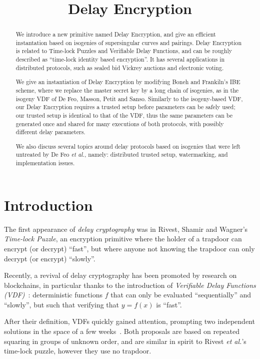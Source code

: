\documentclass{llncs}
\title{Delay Encryption}
\begin{document}
\maketitle

\begin{abstract}
  We introduce a new primitive named Delay Encryption, and give an
  efficient instantation based on isogenies of supersingular curves
  and pairings. %
  Delay Encryption is related to Time-lock Puzzles and Verifiable
  Delay Functions, and can be roughly described as ``time-lock
  identity based encryption''. %
  It has several applications in distributed protocols, such as
  sealed bid Vickrey auctions and electronic voting.

  We give an instantiation of Delay Encryption by modifying Boneh and
  Frankiln's IBE scheme, where we replace the master secret key by a
  long chain of isogenies, as in the isogeny VDF of De Feo, Masson, 
  Petit and Sanso. %
  Similarly to the isogeny-based VDF, our Delay Encryption requires a
  trusted setup before parameters can be safely used; our trusted
  setup is identical to that of the VDF, thus the same parameters can
  be generated once and shared for many executions of both protocols,
  with possibly different delay parameters.

  We also discuss several topics around delay protocols
  based on isogenies that were left untreated by De Feo \emph{et al.},
  namely: distributed trusted setup, watermarking, and implementation
  issues.
\end{abstract}

\section{Introduction}
\label{sec:introduction}

The first appearance of \emph{delay cryptography} was in Rivest,
Shamir and Wagner's~\cite{TLP} \emph{Time-lock Puzzle}, an encryption
primitive where the holder of a trapdoor can encrypt (or decrypt)
``fast'', but where anyone not knowing the trapdoor can only decrypt
(or encrypt) ``slowly''.

Recently, a revival of delay cryptography has been promoted by
research on blockchains, in particular thanks to the introduction of
\emph{Verifiable Delay Functions (VDF)}~\cite{Boneh}: deterministic
functions $f$ that can only be evaluated  ``sequentially'' and ``slowly'',
but such that verifying that $y=f(x)$ is ``fast''. %

After their definition, VDFs quickly gained attention, prompting two
independent solutions in the space of a few
weeks~\cite{Wesolowski,Pietrzak}. %
Both proposals are based on repeated squaring in groups of unknown
order, and are similar in spirit to Rivest \emph{et al.}'s time-lock
puzzle, however they use no trapdoor.
\end{document}
